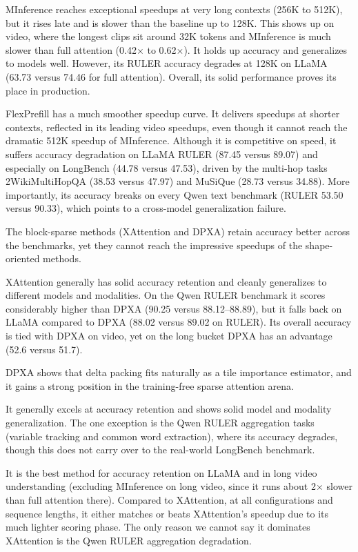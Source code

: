 MInference reaches exceptional speedups at very long contexts (256K to 512K), but it rises late and is slower than the baseline up to 128K. This shows up on video, where the longest clips sit around 32K tokens and MInference is much slower than full attention (0.42$\times$ to 0.62$\times$). It holds up accuracy and generalizes to models well. However, its RULER accuracy degrades at 128K on LLaMA (63.73 versus 74.46 for full attention). Overall, its solid performance proves its place in production.

FlexPrefill has a much smoother speedup curve. It delivers speedups at shorter contexts, reflected in its leading video speedups, even though it cannot reach the dramatic 512K speedup of MInference. Although it is competitive on speed, it suffers accuracy degradation on LLaMA RULER (87.45 versus 89.07) and especially on LongBench (44.78 versus 47.53), driven by the multi-hop tasks 2WikiMultiHopQA (38.53 versus 47.97) and MuSiQue (28.73 versus 34.88). More importantly, its accuracy breaks on every Qwen text benchmark (RULER 53.50 versus 90.33), which points to a cross-model generalization failure.

The block-sparse methods (XAttention and DPXA) retain accuracy better across the benchmarks, yet they cannot reach the impressive speedups of the shape-oriented methods.

XAttention generally has solid accuracy retention and cleanly generalizes to different models and modalities. On the Qwen RULER benchmark it scores considerably higher than DPXA (90.25 versus 88.12--88.89), but it falls back on LLaMA compared to DPXA (88.02 versus 89.02 on RULER). Its overall accuracy is tied with DPXA on video, yet on the long bucket DPXA has an advantage (52.6 versus 51.7).

DPXA shows that delta packing fits naturally as a tile importance estimator, and it gains a strong position in the training-free sparse attention arena.

It generally excels at accuracy retention and shows solid model and modality generalization. The one exception is the Qwen RULER aggregation tasks (variable tracking and common word extraction), where its accuracy degrades, though this does not carry over to the real-world LongBench benchmark.

It is the best method for accuracy retention on LLaMA and in long video understanding (excluding MInference on long video, since it runs about 2$\times$ slower than full attention there). Compared to XAttention, at all configurations and sequence lengths, it either matches or beats XAttention's speedup due to its much lighter scoring phase. The only reason we cannot say it dominates XAttention is the Qwen RULER aggregation degradation.

